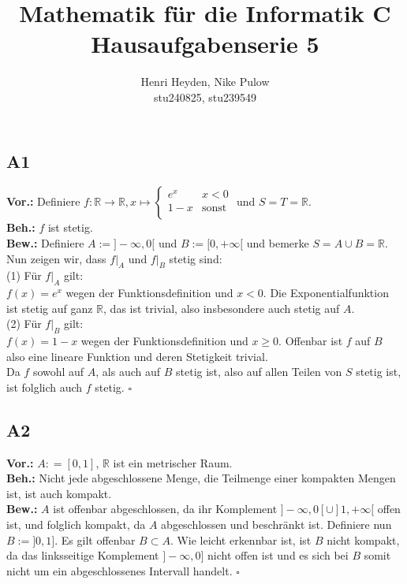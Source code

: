 \documentclass[12pt, a4paper]{article}
\title{Mathematik für die Informatik C\\Hausaufgabenserie 5}
\author{Henri Heyden, Nike Pulow \\ \small stu240825, stu239549}
\date{}
\newcommand*{\qed}{\null\nobreak\hfill\ensuremath{\square}}
\newcommand*{\gap}{\text{ }}
\newcommand*{\vor}{\textbf{Vor.:} \gap}
\newcommand*{\beh}{\textbf{Beh.:} \gap}
\newcommand*{\bew}{\textbf{Bew.:} \gap}
\begin{document}
\maketitle

\doublespacing

\subsection*{A1}
\vor Definiere \(f : \mathbb{R} \rightarrow \mathbb{R}, x \mapsto
\begin{cases}
    e^x & x < 0\\
    1-x & \text{sonst}\\
\end{cases}\)  und \(S=T=\mathbb{R}\).\\
\beh \(f\) ist stetig.\\
\bew Definiere \(A:=]- \infty, 0 [\) und \(B := [0,+ \infty[\) und bemerke \(S=A \cup B = \mathbb{R}\). 
Nun zeigen wir, dass \(f |_A\) und \(f |_B\) stetig sind:\\
(1) Für \(f |_A\) gilt: \\
\(f(x) = e^x\) wegen der Funktionsdefinition und \(x<0\). Die Exponentialfunktion ist stetig auf 
ganz \(\mathbb{R}\), das ist trivial, also insbesondere auch stetig auf \(A\).\\
(2) Für \(f|_B\) gilt: \\
\(f(x) = 1-x\) wegen der Funktionsdefinition und \(x \geq 0\). Offenbar ist \(f\) auf \(B\) also 
eine lineare Funktion und deren Stetigkeit trivial.\\
Da \(f\) sowohl auf \(A\), als auch auf \(B\) stetig ist, also auf allen Teilen von \(S\) 
stetig ist, ist folglich auch \(f\) stetig. \qed

\subsection*{A2}
\vor \(A : = [0,1]\), \(\mathbb{R}\) ist ein metrischer Raum.\\
\beh Nicht jede abgeschlossene Menge, die Teilmenge einer kompakten Mengen ist, ist auch kompakt.\\
\bew \(A\) ist offenbar abgeschlossen, da ihr Komplement \(]-\infty,0[\cup]1,+\infty[\) offen ist, 
und folglich kompakt, da \(A\) abgeschlossen und beschränkt ist. Definiere nun \(B:=]0,1]\). Es gilt 
offenbar \(B \subset A\). Wie leicht erkennbar ist, ist \(B\) nicht kompakt, da das linksseitige 
Komplement \(]-\infty,0]\) nicht offen ist und es sich bei \(B\) somit nicht um ein 
abgeschlossenes Intervall handelt. \qed
\end{document}
